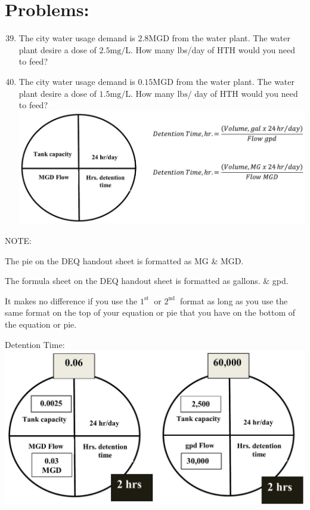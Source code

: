 \documentclass[10pt]{article}
\begin{document}
\section{Problems:}
\begin{enumerate}
  \setcounter{enumi}{38}
  \item The city water usage demand is $2.8 \mathrm{MGD}$ from the water plant. The water plant desire a dose of $2.5 \mathrm{mg} / \mathrm{L}$. How many lbs/day of $\mathrm{HTH}$ would you need to feed?

  \item The city water usage demand is $0.15 \mathrm{MGD}$ from the water plant. The water plant desire a dose of $1.5 \mathrm{mg} / \mathrm{L}$. How many $\mathrm{lbs} /$ day of $\mathrm{HTH}$ would you need to feed?\\

\includegraphics[max width=\textwidth]{2022_09_16_0c6b804a9b26a8df4e8fg-13}

\end{enumerate}
NOTE:

The pie on the DEQ handout sheet is formatted as MG \& MGD.

The formula sheet on the DEQ handout sheet is formatted as gallons. \& gpd.

It makes no difference if you use the $1^{\text {st }}$ or $2^{\text {nd }}$ format as long as you use the same format on the top of your equation or pie that you have on the bottom of the equation or pie.

Detention Time:\\

\includegraphics[max width=\textwidth]{2022_09_16_0c6b804a9b26a8df4e8fg-13(1)}
\end{document}
